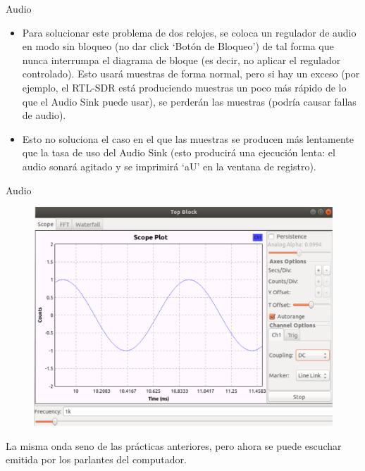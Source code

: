 \begin{frame}{Audio}
\begin{itemize}
    \item 
    {Para solucionar este problema de dos relojes, se coloca un regulador de audio en modo sin bloqueo (no dar click ‘Botón de Bloqueo’) de tal forma que nunca interrumpa el diagrama de bloque (es decir, no aplicar el regulador controlado). Esto usará muestras de forma normal, pero si hay un exceso (por ejemplo, el RTL-SDR está produciendo muestras un poco más rápido de lo que el Audio Sink puede usar), se perderán las muestras (podría causar fallas de audio).}
    \item 
    {Esto no soluciona el caso en el que las muestras se producen más lentamente que la tasa de uso del Audio Sink (esto producirá una ejecución lenta: el audio sonará agitado y se imprimirá ‘aU’ en la ventana de registro).}
\end{itemize}



\end{frame}

\begin{frame}{Audio}

\begin{figure}

\begin{center}
\vspace{-7mm}
\includegraphics[width=\textwidth, height=0.6\paperheight]{parte1/lab3/pdf/lab3_5.pdf}
\end{center}
\end{figure}
\vspace{-4mm}
La misma onda seno de las prácticas anteriores, pero ahora se puede escuchar emitida por los parlantes del computador.
\end{frame}

